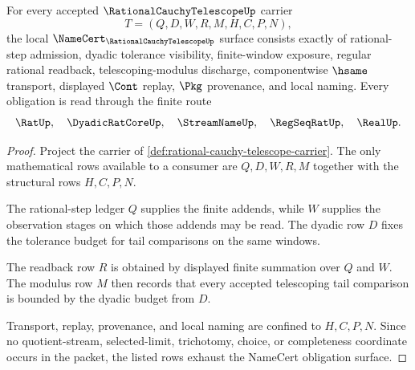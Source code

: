 \begin{theorem}
\label{thm:rational-cauchy-telescope-namecert-obligations}
For every accepted $\RationalCauchyTelescopeUp$ carrier
$$
T=(Q,D,W,R,M,H,C,P,N),
$$
the local $\NameCert_{\RationalCauchyTelescopeUp}$ surface consists exactly of rational-step admission, dyadic tolerance visibility, finite-window exposure, regular rational readback, telescoping-modulus discharge, componentwise $\hsame$ transport, displayed $\Cont$ replay, $\Pkg$ provenance, and local naming. Every obligation is read through the finite route
$$
\RatUp,\quad \DyadicRatCoreUp,\quad \StreamNameUp,\quad \RegSeqRatUp,\quad \RealUp .
$$
\end{theorem}
\begin{proof}
Project the carrier of \autoref{def:rational-cauchy-telescope-carrier}. The only mathematical rows available to a consumer are $Q,D,W,R,M$ together with the structural rows $H,C,P,N$.

The rational-step ledger $Q$ supplies the finite addends, while $W$ supplies the observation stages on which those addends may be read. The dyadic row $D$ fixes the tolerance budget for tail comparisons on the same windows.

The readback row $R$ is obtained by displayed finite summation over $Q$ and $W$. The modulus row $M$ then records that every accepted telescoping tail comparison is bounded by the dyadic budget from $D$.

Transport, replay, provenance, and local naming are confined to $H,C,P,N$. Since no quotient-stream, selected-limit, trichotomy, choice, or completeness coordinate occurs in the packet, the listed rows exhaust the NameCert obligation surface.
\end{proof}

